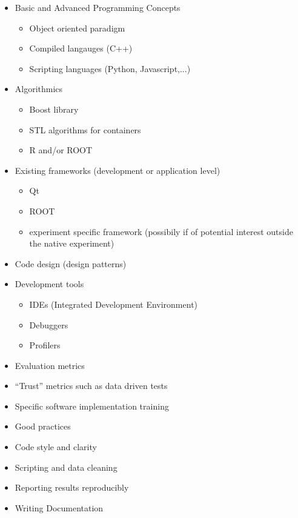 \documentclass[12pt,a4paper]{article}
\begin{document}
\begin{itemize}
   \item Basic and Advanced Programming Concepts
   \begin{itemize}
      \item Object oriented paradigm
      \item Compiled langauges (C++)
      \item Scripting languages (Python, Javascript,...)
   \end{itemize}
   \item Algorithmics 
   \begin{itemize}
      \item Boost library
      \item STL algorithms for containers
      \item R and/or ROOT
   \end{itemize}
   \item Existing frameworks (development or application level)
   \begin{itemize}
      \item Qt
      \item ROOT
      \item experiment specific framework (possibily if of potential interest outside the native experiment)
   \end{itemize}
   \item Code design (design patterns)
   \item Development tools
   \begin{itemize}
      \item IDEs (Integrated Development Environment)
      \item Debuggers
      \item Profilers
   \end{itemize}
   \item Evaluation metrics
   \item “Trust” metrics such as data driven tests
   \item Specific software implementation training
   \item Good practices 
   \item Code style and clarity
   \item Scripting and data cleaning
   \item Reporting results reproducibly
   \item Writing Documentation
\end{itemize}


\end{document}
